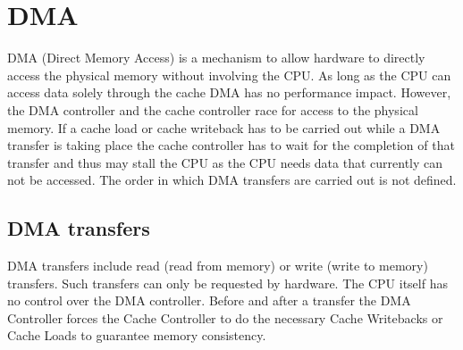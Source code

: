 \section{DMA}

DMA (Direct Memory Access) is a mechanism to allow hardware to directly access the physical memory without involving the CPU. 
As long as the CPU can access data solely through the cache DMA has no performance impact. However, the DMA controller and the cache controller
race for access to the physical memory. If a cache load or cache writeback has to be carried out while a DMA transfer is taking place the
cache controller has to wait for the completion of that transfer and thus may stall the CPU as the CPU needs data that currently can not be accessed.
The order in which DMA transfers are carried out is not defined. 

\subsection{DMA transfers}

DMA transfers include read (read from memory) or write (write to memory) transfers. Such transfers can only be requested by hardware. The CPU itself has no control
over the DMA controller. Before and after a transfer the DMA Controller forces the Cache Controller to do the necessary Cache Writebacks or Cache Loads
to guarantee memory consistency. 
